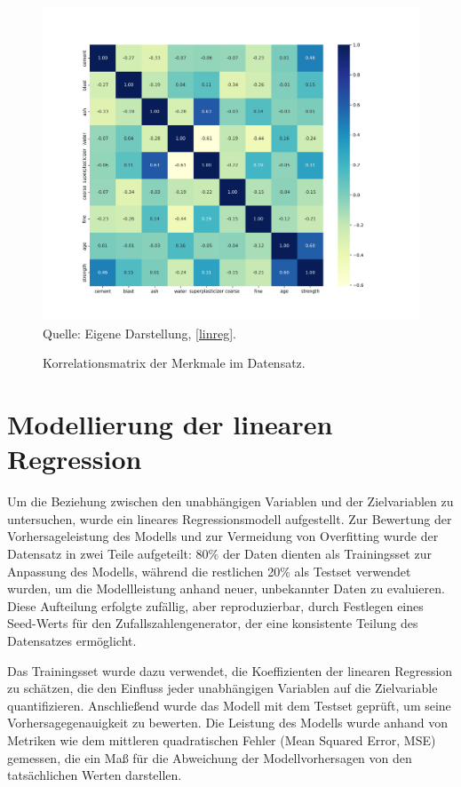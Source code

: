 \begin{figure}[h]
    \caption{Korrelationsmatrix der Merkmale im Datensatz.}
    \includegraphics[width=1\textwidth]{../scripts/images/corr.png}
    Quelle: Eigene Darstellung, \ref{linreg}.
    \label{pic:corr}
\end{figure}

\section{Modellierung der linearen Regression}

Um die Beziehung zwischen den unabhängigen Variablen und der Zielvariablen  zu untersuchen, 
wurde ein lineares Regressionsmodell aufgestellt. 
Zur Bewertung der Vorhersageleistung des Modells und zur Vermeidung von Overfitting wurde der 
Datensatz in zwei Teile aufgeteilt: 80\% der Daten dienten als Trainingsset zur 
Anpassung des Modells, während die restlichen 20\% als Testset verwendet wurden, 
um die Modellleistung anhand neuer, unbekannter Daten zu evaluieren. 
Diese Aufteilung erfolgte zufällig, aber reproduzierbar, durch Festlegen eines Seed-Werts 
für den Zufallszahlengenerator, der eine konsistente Teilung des Datensatzes ermöglicht.

Das Trainingsset wurde dazu verwendet, die Koeffizienten der linearen Regression zu schätzen, 
die den Einfluss jeder unabhängigen Variablen auf die Zielvariable quantifizieren. 
Anschließend wurde das Modell mit dem Testset geprüft, um seine Vorhersagegenauigkeit zu bewerten. 
Die Leistung des Modells wurde anhand von Metriken wie dem mittleren quadratischen Fehler (Mean Squared Error, MSE) gemessen, 
die ein Maß für die Abweichung der Modellvorhersagen von den tatsächlichen Werten darstellen.

